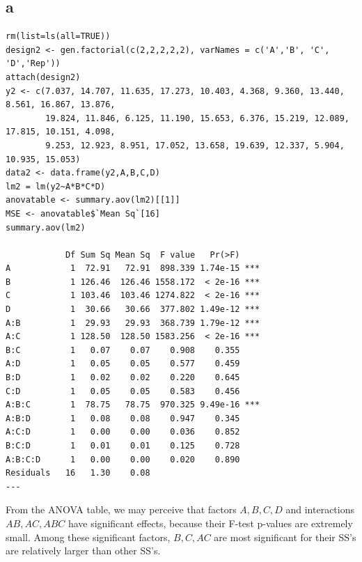 \documentclass[11pt,letterpaper]{article}
\begin{document}
\subsection*{a}
\begin{verbatim}
rm(list=ls(all=TRUE))
design2 <- gen.factorial(c(2,2,2,2,2), varNames = c('A','B', 'C', 'D','Rep'))
attach(design2)
y2 <- c(7.037, 14.707, 11.635, 17.273, 10.403, 4.368, 9.360, 13.440, 8.561, 16.867, 13.876, 
        19.824, 11.846, 6.125, 11.190, 15.653, 6.376, 15.219, 12.089, 17.815, 10.151, 4.098, 
        9.253, 12.923, 8.951, 17.052, 13.658, 19.639, 12.337, 5.904, 10.935, 15.053)
data2 <- data.frame(y2,A,B,C,D)
lm2 = lm(y2~A*B*C*D)
anovatable <- summary.aov(lm2)[[1]]
MSE <- anovatable$`Mean Sq`[16]
summary.aov(lm2)

            Df Sum Sq Mean Sq  F value   Pr(>F)    
A            1  72.91   72.91  898.339 1.74e-15 ***
B            1 126.46  126.46 1558.172  < 2e-16 ***
C            1 103.46  103.46 1274.822  < 2e-16 ***
D            1  30.66   30.66  377.802 1.49e-12 ***
A:B          1  29.93   29.93  368.739 1.79e-12 ***
A:C          1 128.50  128.50 1583.256  < 2e-16 ***
B:C          1   0.07    0.07    0.908    0.355    
A:D          1   0.05    0.05    0.577    0.459    
B:D          1   0.02    0.02    0.220    0.645    
C:D          1   0.05    0.05    0.583    0.456    
A:B:C        1  78.75   78.75  970.325 9.49e-16 ***
A:B:D        1   0.08    0.08    0.947    0.345    
A:C:D        1   0.00    0.00    0.036    0.852    
B:C:D        1   0.01    0.01    0.125    0.728    
A:B:C:D      1   0.00    0.00    0.020    0.890    
Residuals   16   1.30    0.08                      
---
\end{verbatim}

\noindent From the ANOVA table, we may perceive that factors $A, B, C, D$ and interactions $AB, AC, ABC$ have significant effects, because their F-test p-values are extremely small. Among these significant factors, $B, C, AC$ are most significant for their SS's are relatively larger than other SS's.
\end{document}
